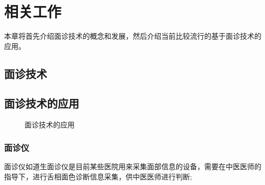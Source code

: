 \chapter{相关工作}

本章将首先介绍面诊技术的概念和发展，然后介绍当前比较流行的基于面诊技术的应用。
\section{面诊技术}

\section{面诊技术的应用}

\begin{figure}[h]
    \centering
    \caption{面诊技术的应用}
    \label{fig:med}
\end{figure}

\subsection{面诊仪}
面诊仪如道生面诊仪\cite{邸丹2016手持式舌象仪的研制}是目前某些医院用来采集面部信息的设备，需要在中医医师的指导下，进行舌相面色诊断信息采集，供中医医师进行判断; 


